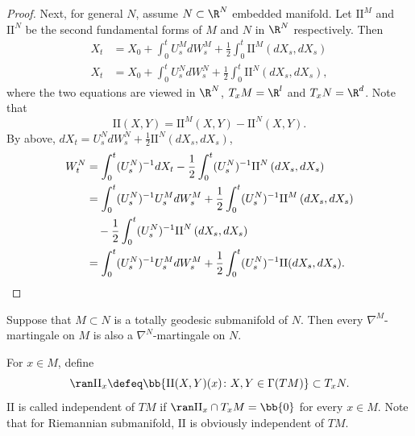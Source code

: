 \begin{proof}
    Next, for general $N$, assume $N \subset \R^N$ embedded manifold. Let $\mathrm{II}^{M}$ and $\mathrm{II}^N$ be the second fundamental forms of $M$ and $N$ in $\R^N$ respectively. Then
    \begin{align*}
        X_t&=X_0+\int_0^t U^M_s d W^M_s+\frac{1}{2} \int_0^t \mathrm{II}^{M}\left(d X_s, d X_s\right) \\
        X_t&=X_0+\int_0^t U^N_s d W^N_s+\frac{1}{2} \int_0^t \mathrm{II}^{N}\left(d X_s, d X_s\right),
    \end{align*}
    where the two equations are viewed in $\R^N$, $T_xM = \R^l$ and $T_xN = \R^d$. Note that
    \begin{equation*}
        \mathrm{II}(X,Y) = \mathrm{II}^M(X,Y) - \mathrm{II}^N(X,Y).
    \end{equation*}
    By above, $dX_t = U^N_s dW^N_s + \frac{1}{2} \mathrm{II}^{N}\left(d X_s, d X_s\right)$,
    \begin{align*}
        W^N_t &= \int_0^t (U^N_s)^{-1}dX_t - \frac{1}{2}\int_0^t (U_s^N)^{-1}\mathrm{II}^{N}\left(d X_s, d X_s\right) \\
        &= \int_0^t (U^N_s)^{-1}U^M_s d W^M_s + \frac{1}{2}\int_0^t (U^N_s)^{-1}\mathrm{II}^{M}\left(d X_s, d X_s\right) \\
        & \quad - \frac{1}{2}\int_0^t (U_s^N)^{-1}\mathrm{II}^{N}\left(d X_s, d X_s\right) \\
        &= \int_0^t (U^N_s)^{-1}U^M_s d W^M_s + \frac{1}{2} \int_0^t(U^N_s)^{-1}\mathrm{II}(dX_s,dX_s). \qedhere
    \end{align*}
\end{proof}

\begin{cor}
    Suppose that $M \subset N$ is a totally geodesic submanifold of $N$. Then every $\nabla^M$-martingale on $M$ is also a $\nabla^N$-martingale on $N$.
\end{cor}

For $x \in M$, define
\begin{equation*}
    \ran \mathrm{II}_x \defeq \bb{\mathrm{II}(X,Y)(x) \colon X,Y \in \Gamma(TM)} \subset T_xN.
\end{equation*}
$\mathrm{II}$ is called independent of $TM$ if $\ran \mathrm{II}_x \cap T_xM = \bb{0}$ for every $x \in M$. Note that for Riemannian submanifold, $\mathrm{II}$ is obviously independent of $TM$.

